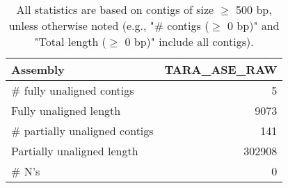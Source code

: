 \documentclass[12pt,a4paper]{article}
\begin{document}
\begin{table}[ht]
\begin{center}
\caption{All statistics are based on contigs of size $\geq$ 500 bp, unless otherwise noted (e.g., "\# contigs ($\geq$ 0 bp)" and "Total length ($\geq$ 0 bp)" include all contigs).}
\begin{tabular}{|l*{1}{|r}|}
\hline
Assembly & TARA\_ASE\_RAW \\ \hline
\# fully unaligned contigs & 5 \\ \hline
Fully unaligned length & 9073 \\ \hline
\# partially unaligned contigs & 141 \\ \hline
Partially unaligned length & 302908 \\ \hline
\# N's & 0 \\ \hline
\end{tabular}
\end{center}
\end{table}
\end{document}
